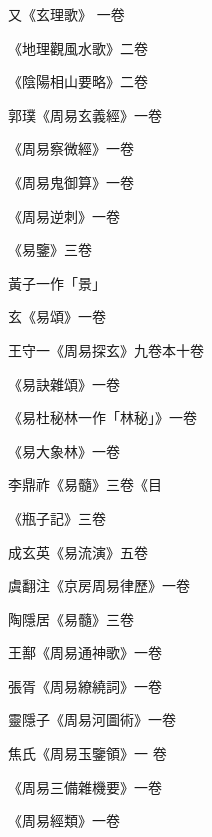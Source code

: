 \begin{pinyinscope}
 又《玄理歌》
 一卷



 《地理觀風水歌》二卷



 《陰陽相山要略》二卷



 郭璞《周易玄義經》一卷



 《周易察微經》一卷



 《周易鬼御算》一卷



 《周易逆刺》一卷



 《易鑒》三卷



 黃子一作「景」



 玄《易頌》一卷



 王守一《周易探玄》九卷本十卷



 《易訣雜頌》一卷



 《易杜秘林一作「林秘」》一卷



 《易大象林》一卷



 李鼎祚《易髓》三卷《目



 《瓶子記》三卷



 成玄英《易流演》五卷



 虞翻注《京房周易律歷》一卷



 陶隱居《易髓》三卷



 王鄯《周易通神歌》一卷



 張胥《周易繚繞詞》一卷



 靈隱子《周易河圖術》一卷



 焦氏《周易玉鑒領》一
 卷



 《周易三備雜機要》一卷



 《周易經類》一卷




\end{pinyinscope}
